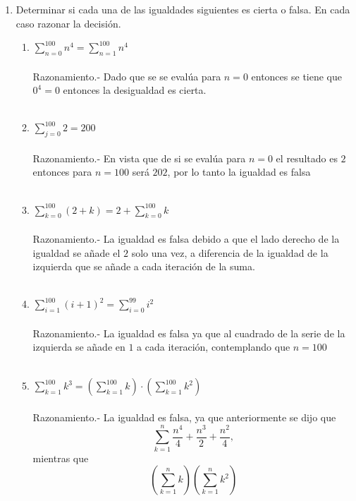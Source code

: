 \begin{enumerate}
\item Determinar si cada una de las igualdades siguientes es cierta o falsa. En cada caso razonar la decisión.
\begin{enumerate}[\bfseries (a)]
\item $\displaystyle\sum_{n=0}^{100} n^4= \sum_{n=1}^{100} n^4$\\\\
Razonamiento.- \; Dado que se se evalúa para $n=0$ entonces se tiene que $0^4 = 0$ entonces la desigualdad es cierta.\\\\

\item $\displaystyle\sum_{j=0}^{100} 2 = 200$\\\\
Razonamiento.- \; En vista que de si se evalúa para $n=0$ el resultado es $2$ entonces para $n=100$ será $202$, por lo tanto la igualdad es falsa\\\\

\item $\displaystyle\sum_{k=0}^{100} (2+k) = 2 + \sum_{k=0}^{100} k$\\\\
Razonamiento.- \; La igualdad es falsa debido a que el lado derecho de la igualdad se añade el $2$ solo una vez, a diferencia de la igualdad de la izquierda que se añade a cada iteración de la suma.\\\\

\item $\displaystyle\sum_{i=1}^{100} (i+1)^2 = \sum_{i=0}^{99} i^2$\\\\
Razonamiento.- \; La igualdad es falsa ya que al cuadrado de la serie de la izquierda se añade en $1$ a cada iteración, contemplando que $n=100$\\\\ 

\item $\displaystyle\sum_{k=1}^{100} k^3 = \left( \sum_{k=1}^{100} k \right)\cdot \left(  \sum_{k=1}^{100} k^2 \right)$\\\\
Razonamiento.- \; La igualdad es falsa, ya que anteriormente se dijo que $$\sum\limits_{k=1}^{n} \dfrac{n^4}{4} + \dfrac{n^3}{2} + \dfrac{n^2}{4},$$ mientras que $$\left( \sum\limits_{k=1}^{n} k \right)\left( \sum\limits_{k=1}^{n} k^2 \right)$$ \\\\


\end{enumerate}
\end{enumerate}
